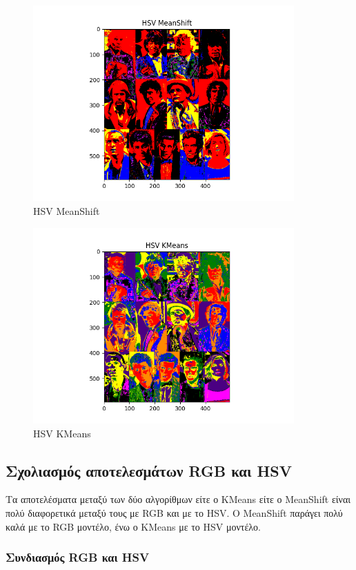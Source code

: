 \begin{figure}[H]
  \centering
  \includegraphics[width=100mm]{Figures/HSV_MeanShift}
  \caption{HSV MeanShift}
  \label{fig:hsv_meanshift}
\end{figure}

\begin{figure}[H]
  \centering
  \includegraphics[width=100mm]{Figures/HSV_KMeans}
  \caption{HSV KMeans}
  \label{fig:hsv_kmeans}
\end{figure}

\subsection{Σχολιασμός αποτελεσμάτων RGB και HSV}
\label{paratiriseis}

Τα αποτελέσματα μεταξύ των δύο αλγορίθμων είτε ο KMeans είτε ο MeanShift είναι πολύ διαφορετικά μεταξύ τους με RGB και με το HSV. Ο MeanShift παράγει πολύ καλά με το RGB μοντέλο, ένω ο KMeans με το HSV μοντέλο.

\subsubsection{Συνδιασμός RGB και HSV}

